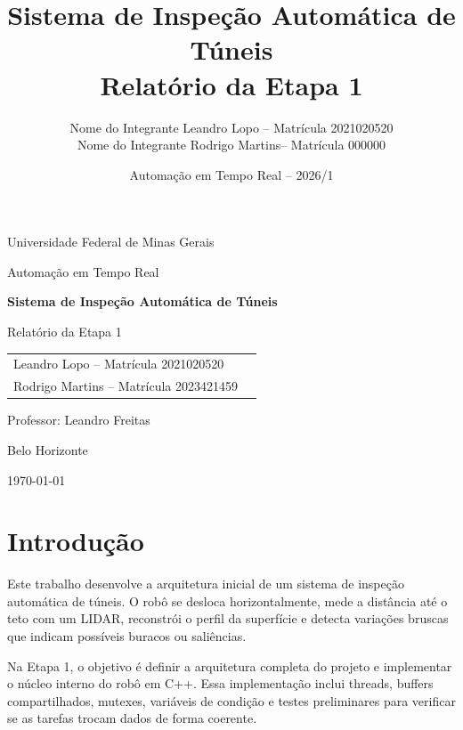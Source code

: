 \documentclass[12pt,a4paper]{article}
\title{Sistema de Inspeção Automática de Túneis\\Relatório da Etapa 1}
\author{
        Nome do Integrante Leandro Lopo -- Matrícula 2021020520\\
        Nome do Integrante Rodrigo Martins-- Matrícula 000000\\
    }
\date{Automação em Tempo Real -- 2026/1}
\begin{document}
    \begin{titlepage}
        \centering
        \vspace*{2cm}
        {\Large Universidade Federal de Minas Gerais\par}
        \vspace{0.5cm}
        {\large Automação em Tempo Real\par}
        \vspace{2cm}
        {\Huge\bfseries Sistema de Inspeção Automática de Túneis\par}
        \vspace{0.5cm}
        {\Large Relatório da Etapa 1\par}
        \vspace{2cm}

        \begin{tabular}{ll}
            Leandro Lopo -- Matrícula 2021020520 \\
            Rodrigo Martins -- Matrícula 2023421459 \\
        \end{tabular}

        \vfill
        Professor: Leandro Freitas\par
        \vspace{0.5cm}
        Belo Horizonte\par
        \today
    \end{titlepage}

    \tableofcontents
    \newpage

    \section{Introdução}

    Este trabalho desenvolve a arquitetura inicial de um sistema de inspeção automática de túneis. O robô se desloca horizontalmente, mede a distância até o teto com um LIDAR, reconstrói o perfil da superfície e detecta variações bruscas que indicam possíveis buracos ou saliências.

    Na Etapa 1, o objetivo é definir a arquitetura completa do projeto e implementar o núcleo interno do robô em C++. Essa implementação inclui threads, buffers compartilhados, mutexes, variáveis de condição e testes preliminares para verificar se as tarefas trocam dados de forma coerente.
\end{document}
